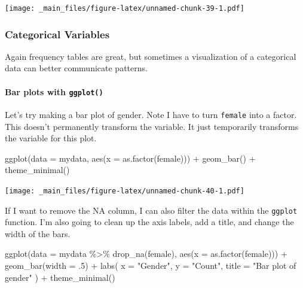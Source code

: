 \documentclass[
]{book}
\newenvironment{Shaded}{\begin{snugshade}}{\end{snugshade}}
\newcommand{\AttributeTok}[1]{\textcolor[rgb]{0.77,0.63,0.00}{#1}}
\newcommand{\DecValTok}[1]{\textcolor[rgb]{0.00,0.00,0.81}{#1}}
\newcommand{\FunctionTok}[1]{\textcolor[rgb]{0.00,0.00,0.00}{#1}}
\newcommand{\NormalTok}[1]{#1}
\newcommand{\SpecialCharTok}[1]{\textcolor[rgb]{0.00,0.00,0.00}{#1}}
\newcommand{\StringTok}[1]{\textcolor[rgb]{0.31,0.60,0.02}{#1}}
\begin{document}
\texttt{[image: \_main\_files/figure-latex/unnamed-chunk-39-1.pdf]}

\hypertarget{categorical-variables-1}{%
\subsubsection{Categorical Variables}\label{categorical-variables-1}}

Again frequency tables are great, but sometimes a visualization of a categorical data can better communicate patterns.

\hypertarget{barplot}{%
\paragraph*{\texorpdfstring{Bar plots with \texttt{ggplot()}}{Bar plots with ggplot()}}\label{barplot}}

Let's try making a bar plot of gender. Note I have to turn \texttt{female} into a factor. This doesn't permanently transform the variable. It just temporarily transforms the variable for this plot.

\begin{Shaded}
\begin{Highlighting}[]
\FunctionTok{ggplot}\NormalTok{(}\AttributeTok{data =}\NormalTok{ mydata, }\FunctionTok{aes}\NormalTok{(}\AttributeTok{x =} \FunctionTok{as.factor}\NormalTok{(female))) }\SpecialCharTok{+} 
  \FunctionTok{geom\_bar}\NormalTok{() }\SpecialCharTok{+} 
  \FunctionTok{theme\_minimal}\NormalTok{()}
\end{Highlighting}
\end{Shaded}

\texttt{[image: \_main\_files/figure-latex/unnamed-chunk-40-1.pdf]}

If I want to remove the NA column, I can also filter the data within the \texttt{ggplot} function. I'm also going to clean up the axis labels, add a title, and change the width of the bars.

\begin{Shaded}
\begin{Highlighting}[]
\FunctionTok{ggplot}\NormalTok{(}\AttributeTok{data =}\NormalTok{ mydata }\SpecialCharTok{\%\textgreater{}\%} \FunctionTok{drop\_na}\NormalTok{(female), }\FunctionTok{aes}\NormalTok{(}\AttributeTok{x =} \FunctionTok{as.factor}\NormalTok{(female))) }\SpecialCharTok{+} 
  \FunctionTok{geom\_bar}\NormalTok{(}\AttributeTok{width =}\NormalTok{ .}\DecValTok{5}\NormalTok{) }\SpecialCharTok{+} 
  \FunctionTok{labs}\NormalTok{(}
    \AttributeTok{x =} \StringTok{"Gender"}\NormalTok{, }
    \AttributeTok{y =} \StringTok{"Count"}\NormalTok{, }
    \AttributeTok{title =} \StringTok{"Bar plot of gender"}
\NormalTok{  ) }\SpecialCharTok{+} 
  \FunctionTok{theme\_minimal}\NormalTok{()}
\end{Highlighting}
\end{Shaded}
\end{document}
